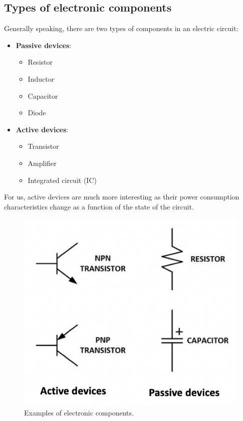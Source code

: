 \subsection{Types of electronic components}

Generally speaking, there are two types of components in an electric circuit:
\begin{itemize}
    \item \textbf{Passive devices}: 
    \begin{itemize}
        \item Resistor
        \item Inductor
        \item Capacitor
        \item Diode
    \end{itemize}
    \item \textbf{Active devices}:
    \begin{itemize}
        \item Transistor
        \item Amplifier
        \item Integrated circuit (IC)
    \end{itemize}
\end{itemize}
For us, active devices are much more interesting as their power consumption characteristics change
as a function of the state of the circuit.

\begin{figure}[!ht]
	\centering
	\includegraphics{images/type_of_electronic_components.png}
	\caption{Examples of electronic components.} \label{fig:type_of_electronic_components}
\end{figure}

